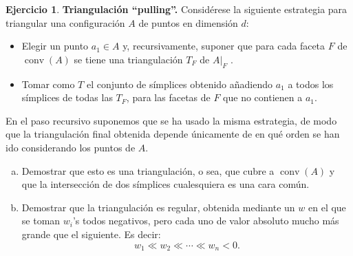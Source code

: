 \documentclass[10pt]{article}
\theoremstyle{definition}
\newtheorem{ejer}{Ejercicio}
\newcommand{\conv}{\operatorname{conv}}
\begin{document}
\begin{ejer}{\bf Triangulación ``pulling''.}
Considérese la siguiente estrategia para triangular una configuración $A$ de puntos en dimensión $d$:
\begin{itemize}
\item Elegir un punto $a_1\in A$ y, recursivamente, suponer que para cada faceta $F$ de $\conv(A)$ se tiene una triangulación $T_F$ de $A|_F$
.

\item Tomar como $T$ el conjunto de símplices obtenido añadiendo $a_1$ a todos los símplices de todas las $T_F$, para las facetas de $F$ que no contienen a $a_1$.
\end{itemize}

En el paso recursivo suponemos que se ha usado la misma estrategia, de modo que la triangulación final obtenida depende únicamente de en qué orden se han ido considerando los puntos de $A$.

\begin{enumerate}[(a)]
\item Demostrar que esto es una triangulación, o sea, que cubre a $\conv(A)$ y que la intersección de dos símplices cualesquiera es una cara común.
\item Demostrar que la triangulación es regular, obtenida mediante un $w$ en el que se toman $w_i$'s todos negativos, pero cada uno de valor absoluto mucho más grande que el siguiente. Es decir:
\[w_1\ll w_2\ll\cdots\ll w_n<0.\]
\end{enumerate}
\end{ejer}
\end{document}
